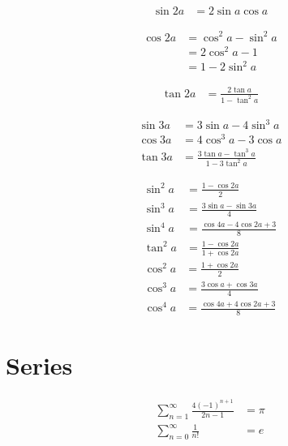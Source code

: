 \documentclass[a4paper, 11pt]{book}
\begin{document}
    \begin{multicols}{2}

        \begin{align}
            \sin{2a} &= 2\sin{a}\cos{a}
        \end{align}

        \begin{equation}
            \begin{split}
                \cos{2a} &= \cos^{2}{a}-\sin^{2}{a}\\
                &= 2\cos^{2}{a}-1\\
                &=1-2\sin^{2}{a}
            \end{split}
        \end{equation}

        \begin{align}
            \tan{2a} &= \frac{2\tan{a}}{1-\tan^{2}{a}}
        \end{align}
            
        \columnbreak

        \begin{align}
            \sin{3a} &= 3\sin{a}-4\sin^{3}{a}\\
            \cos{3a} &= 4\cos^{3}{a}-3\cos{a}\\
            \tan{3a} &= \frac{3\tan{a}-\tan^{3}{a}}{1-3\tan^{2}{a}}
        \end{align}

    \end{multicols}

    \begin{multicols}{2}
        \begin{align}
            \sin^{2}{a} &= \frac{1-\cos{2a}}{2}\\
            \sin^{3}{a} &= \frac{3\sin{a}-\sin{3a}}{4}\\
            \sin^{4}{a} &= \frac{\cos{4a}-4\cos{2a}+3}{8}\\
            \tan^{2}{a} &= \frac{1-\cos{2a}}{1+\cos{2a}}
        \end{align}
        \begin{align}
            \cos^{2}{a} &= \frac{1+\cos{2a}}{2}\\
            \cos^{3}{a} &= \frac{3\cos{a}+\cos{3a}}{4}\\
            \cos^{4}{a} &= \frac{\cos{4a}+4\cos{2a}+3}{8}
        \end{align}
    \end{multicols}

    \chapter{Series}
    
    \begin{align}
        \sum_{n = 1}^{\infty}\frac{4(-1)^{n+1}}{2n-1}&=\pi\\
        \sum_{n = 0}^{\infty}\frac{1}{n!}&=e
    \end{align}
\end{document}
